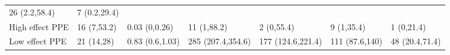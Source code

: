 \documentclass[
]{article}
\begin{document}
\begin{longtable}[]{@{}lllllll@{}}
\begin{minipage}[t]{0.09\columnwidth}
26 (2.2,58.4)\strut
\end{minipage} & \begin{minipage}[t]{0.10\columnwidth}\raggedright
7 (0.2,29.4)\strut
\end{minipage}\tabularnewline
\begin{minipage}[t]{0.18\columnwidth}\raggedright
High effect PPE\strut
\end{minipage} & \begin{minipage}[t]{0.12\columnwidth}\raggedright
16 (7,53.2)\strut
\end{minipage} & \begin{minipage}[t]{0.10\columnwidth}\raggedright
0.03 (0,0.26)\strut
\end{minipage} & \begin{minipage}[t]{0.11\columnwidth}\raggedright
11 (1,88.2)\strut
\end{minipage} & \begin{minipage}[t]{0.11\columnwidth}\raggedright
2 (0,55.4)\strut
\end{minipage} & \begin{minipage}[t]{0.09\columnwidth}\raggedright
9 (1,35.4)\strut
\end{minipage} & \begin{minipage}[t]{0.10\columnwidth}\raggedright
1 (0,21.4)\strut
\end{minipage}\tabularnewline
\begin{minipage}[t]{0.18\columnwidth}\raggedright
Low effect PPE\strut
\end{minipage} & \begin{minipage}[t]{0.12\columnwidth}\raggedright
21 (14,28)\strut
\end{minipage} & \begin{minipage}[t]{0.10\columnwidth}\raggedright
0.83 (0.6,1.03)\strut
\end{minipage} & \begin{minipage}[t]{0.11\columnwidth}\raggedright
285 (207.4,354.6)\strut
\end{minipage} & \begin{minipage}[t]{0.11\columnwidth}\raggedright
177 (124.6,221.4)\strut
\end{minipage} & \begin{minipage}[t]{0.09\columnwidth}\raggedright
111 (87.6,140)\strut
\end{minipage} & \begin{minipage}[t]{0.10\columnwidth}\raggedright
48 (20.4,71.4)\strut
\end{minipage}\tabularnewline

\end{longtable}
\end{document}

